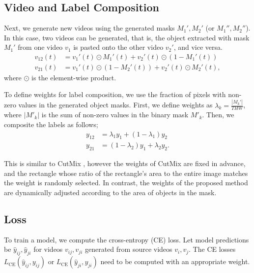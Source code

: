 \subsection{Video and Label Composition}


Next, we generate new videos using the generated masks $M_1', M_2'$ (or $M_1'', M_2''$).
In this case, two videos can be generated,
that is, the object extracted with mask $M_1'$ from one video $v_1$ is pasted onto the other video $v_2'$, and vice versa.
\begin{align}
    v_{12}(t) &= v_1'(t) \odot M_1'(t) + v_2'(t) \odot (1 - M_1'(t)) \\
    v_{21}(t) &= v_1'(t) \odot (1 - M_2'(t)) + v_2'(t) \odot M_2'(t),
\end{align}
where $\odot$ is the element-wise product.


To define weights for label composition, we use the fraction of pixels with non-zero values
in the generated object masks.
First, we define weights as
$\lambda_k = \frac{|M_k'|}{THW}$,
where $|M'_k|$ is the sum of non-zero values in the binary mask $M'_k$.
Then, we composite the labels as follows;
\begin{align}
    y_{12} &= \lambda_1 y_1 + (1 - \lambda_1) y_2 \\
    y_{21} &= (1 - \lambda_2) y_1 + \lambda_2 y_2.
\end{align}

This is similar to CutMix \cite{Yun_2019_ICCV},
however the weights of CutMix are fixed in advance,
and the rectangle whose ratio of the rectangle's area to the entire image
matches the weight is randomly selected.
In contrast, the weights of the proposed method are dynamically adjusted according to the area of objects in the mask.


\subsection{Loss}

To train a model,
we compute the cross-entropy (CE) loss.
Let model predictions be $\hat{y}_{ij}, \hat{y}_{ji}$ for videos $v_{ij}, v_{ji}$
generated from source videos $v_i, v_j$.
The CE losses
$L_\mathrm{CE} (\hat{y}_{ij}, y_{ij})$
or
$L_\mathrm{CE} (\hat{y}_{ji}, y_{ji})$
need to be computed with an appropriate weight.




